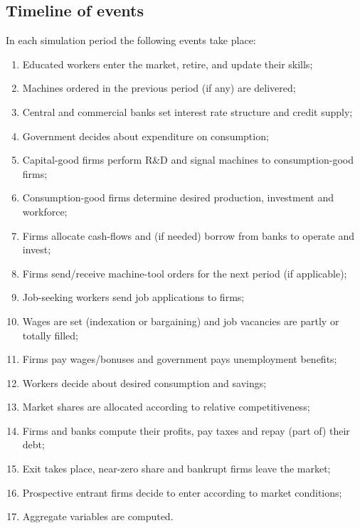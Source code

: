 \documentclass[a4paper,11pt]{article}
\begin{document}
\subsection{Timeline of events}

In each simulation period the following events take place:

\begin{enumerate}
	\item Educated workers enter the market, retire, and update their skills;
	\item Machines ordered in the previous period (if any) are delivered;
	\item Central and commercial banks set interest rate structure and credit supply;
	\item Government decides about expenditure on consumption;
	\item Capital-good firms perform R\&D and signal machines to consumption-good firms;
	\item Consumption-good firms determine desired production, investment and workforce;
	\item Firms allocate cash-flows and (if needed) borrow from banks to operate and invest;
	\item Firms send/receive machine-tool orders for the next period (if applicable);
	\item Job-seeking workers send job applications to firms;
	\item Wages are set (indexation or bargaining) and job vacancies are partly or totally filled;
	\item Firms pay wages/bonuses and government pays unemployment benefits;
	\item Workers decide about desired consumption and savings;
	\item Market shares are allocated according to relative competitiveness;
	\item Firms and banks compute their profits, pay taxes and repay (part of) their debt;
	\item Exit takes place, near-zero share and bankrupt firms leave the market;
	\item Prospective entrant firms decide to enter according to market conditions;
	\item Aggregate variables are computed.
\end{enumerate}
\end{document}
